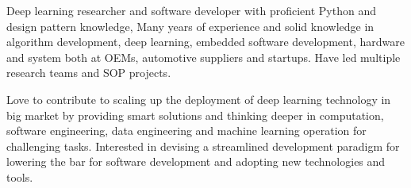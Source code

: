 \documentclass[../resume_xin.tex]{subfiles}
\begin{document}


\begin{cvparagraph}

Deep learning researcher and software developer with proficient Python and design pattern knowledge, Many years of experience and solid knowledge in algorithm development, deep learning, embedded software development, hardware and system both at OEMs, automotive suppliers and startups. Have led multiple research teams and SOP projects.

Love to contribute to scaling up the deployment of deep learning technology in big market by providing smart solutions and thinking deeper in computation, software engineering, data engineering and machine learning operation for challenging tasks. Interested in devising a streamlined development paradigm for lowering the bar for software development and adopting new technologies and tools.

\end{cvparagraph}
\end{document}
